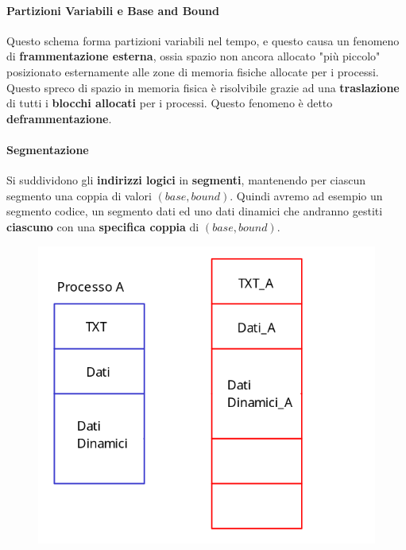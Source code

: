 \documentclass{article}
\begin{document}
\newpage

\paragraph{Partizioni Variabili e Base and Bound} Questo schema forma partizioni variabili nel tempo, e questo causa un fenomeno di \textbf{frammentazione esterna}, 
ossia spazio non ancora allocato "più piccolo" posizionato esternamente alle zone di memoria fisiche allocate per i processi. Questo spreco di spazio in memoria fisica è risolvibile grazie ad una \textbf{traslazione} di tutti i \textbf{blocchi allocati} per i processi. Questo fenomeno è detto \textbf{deframmentazione}.

\paragraph{Segmentazione}

Si suddividono gli \textbf{indirizzi logici} in \textbf{segmenti}, mantenendo per ciascun segmento una coppia di valori $(base, bound)$. Quindi avremo ad esempio un segmento codice, un segmento dati ed uno dati dinamici che andranno gestiti \textbf{ciascuno} con una \textbf{specifica coppia} di $(base, bound)$.

\begin{figure}[htbp]
    \center
    \includegraphics[scale=0.35]{img/segmentazione.png}
\end{figure}
\end{document}
